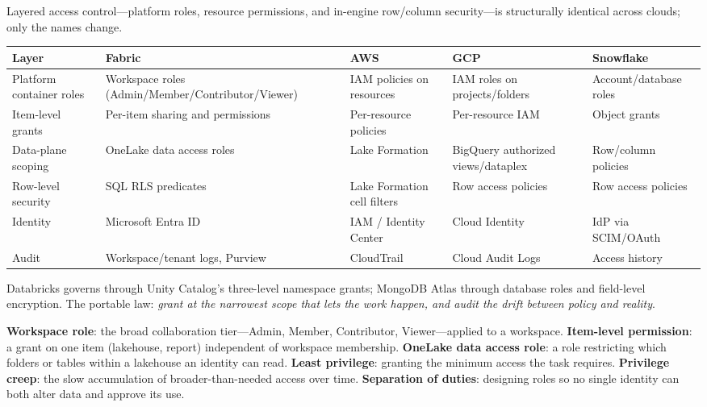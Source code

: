 \begin{crosscloud}
Layered access control---platform roles, resource permissions, and in-engine row/column security---is structurally identical across clouds; only the names change.

\vspace{2mm}
{\footnotesize
\begin{tabular}{@{}p{2.8cm}p{3.2cm}p{3.2cm}p{3.2cm}p{3.2cm}@{}}
\toprule
\textbf{Layer} & \textbf{Fabric} & \textbf{AWS} & \textbf{GCP} & \textbf{Snowflake} \\
\midrule
Platform container roles & Workspace roles (Admin/Member/Contributor/Viewer) & IAM policies on resources & IAM roles on projects/folders & Account/database roles \\
Item-level grants & Per-item sharing and permissions & Per-resource policies & Per-resource IAM & Object grants \\
Data-plane scoping & OneLake data access roles & Lake Formation & BigQuery authorized views/dataplex & Row/column policies \\
Row-level security & SQL RLS predicates & Lake Formation cell filters & Row access policies & Row access policies \\
Identity & Microsoft Entra ID & IAM / Identity Center & Cloud Identity & IdP via SCIM/OAuth \\
Audit & Workspace/tenant logs, Purview & CloudTrail & Cloud Audit Logs & Access history \\
\bottomrule
\end{tabular}}

\vspace{1mm}
Databricks governs through Unity Catalog's three-level namespace grants; MongoDB Atlas through database roles and field-level encryption. The portable law: \emph{grant at the narrowest scope that lets the work happen, and audit the drift between policy and reality}.
\end{crosscloud}

\begin{keyterms}
\textbf{Workspace role}: the broad collaboration tier---Admin, Member, Contributor, Viewer---applied to a workspace. \quad
\textbf{Item-level permission}: a grant on one item (lakehouse, report) independent of workspace membership. \quad
\textbf{OneLake data access role}: a role restricting which folders or tables within a lakehouse an identity can read. \quad
\textbf{Least privilege}: granting the minimum access the task requires. \quad
\textbf{Privilege creep}: the slow accumulation of broader-than-needed access over time. \quad
\textbf{Separation of duties}: designing roles so no single identity can both alter data and approve its use.
\end{keyterms}

